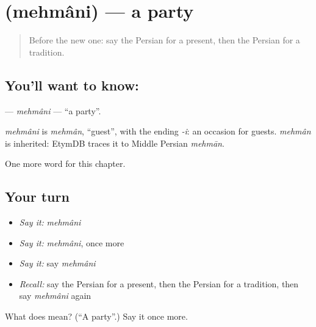 \section[\texorpdfstring{\fa{مهمانی} (mehmâni)}{مهمانی (mehmâni)}]{ (mehmâni) — a party}

\label{lesson:FA-C207-mehmani}



\begin{quote}
Before the new one: say the Persian for a present, then the Persian for a tradition.
\end{quote}

\subsection*{You'll want to know: }
\textbf{} — \emph{mehmâni} — \textquotedblleft{}a party\textquotedblright{}.

\begin{cousinweb}
\emph{mehmâni} is \emph{mehmân}, \textquotedblleft{}guest\textquotedblright{}, with the ending \emph{-i}: an occasion for guests. \emph{mehmân} is inherited: EtymDB traces it to Middle Persian \emph{mehmān}.
\end{cousinweb}

\begin{grammarlens}[title={What you've built}]
One more word for this chapter.
\end{grammarlens}

\subsection*{Your turn}
\begin{itemize}
\raggedright
  \item \emph{Say it:} \emph{mehmâni}
  \item \emph{Say it:} \emph{mehmâni}, once more
  \item \emph{Say it:} say \emph{mehmâni}
  \item \emph{Recall:} say the Persian for a present, then the Persian for a tradition, then say \emph{mehmâni} again
\end{itemize}

\begin{tcolorbox}[breakable,colback=teal!4,colframe=teal!35!black,title={Before you move on}]
What does  mean? (\textquotedblleft{}A party\textquotedblright{}.) Say it once more.
\end{tcolorbox}
